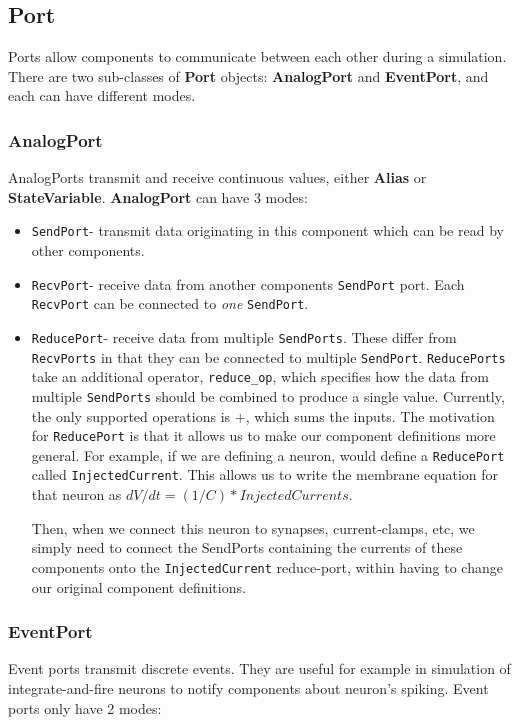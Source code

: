 \documentclass{article}
\newcommand{\nmlClass}[1]{{\bf #1}}
\newcommand{\StateVariable}{{\bf{StateVariable}}\xspace}
\newcommand{\Alias}{{\bf{Alias}}\xspace}
\newcommand{\AnalogPort}{{\bf{AnalogPort}}\xspace}
\newcommand{\SendPort}{{\tt{SendPort}}\xspace}
\newcommand{\RecvPort}{{\tt{RecvPort}}\xspace}
\newcommand{\ReducePort}{{\tt{ReducePort}}\xspace}
\newcommand{\SendPorts}{{\tt{SendPorts}}\xspace}
\newcommand{\RecvPorts}{{\tt{RecvPorts}}\xspace}
\newcommand{\ReducePorts}{{\tt{ReducePorts}}\xspace}
\begin{document}
\subsection{Port}
\label{ports}

Ports allow components to communicate between each other during a simulation.
There are two sub-classes of \nmlClass{Port} objects: \nmlClass{AnalogPort}
and \nmlClass{EventPort}, and each can have different modes.

\subsubsection{AnalogPort}

AnalogPorts transmit and receive continuous values, either \Alias
or \StateVariable. \AnalogPort can have 3 modes:
\begin{itemize}
\item \SendPort - transmit data originating in this component which can
be read by other components.
\item \RecvPort - receive data from another components \SendPort
port. Each \RecvPort can be connected to \emph{one} \SendPort.
\item \ReducePort - receive data from multiple \SendPorts. These
differ from \RecvPorts in that they can be connected to multiple
\SendPort. \ReducePorts take an additional operator,
{\tt reduce\_op}, which specifies how the data from multiple \SendPorts
should be combined to produce a single value. Currently, the
only supported operations is $+$, which sums the inputs.
The motivation for \ReducePort is that it allows us to make our
component definitions more general. For example, if we are defining a
neuron, would define a \ReducePort called {\tt InjectedCurrent}.
This allows us to write the membrane equation for that neuron as
$dV/dt = (1/C) * InjectedCurrents$.

Then, when we connect this neuron to synapses, current-clamps, etc, we
simply need to connect the SendPorts containing the currents of these
components onto the {\tt InjectedCurrent} reduce-port, within having
to change our original component definitions.
\end{itemize}

\subsubsection{EventPort}
\label{eventPorts}

Event ports transmit discrete events. They are useful for example in
simulation of integrate-and-fire neurons to notify components about neuron's
spiking. Event ports only have 2 modes:
\end{document}
